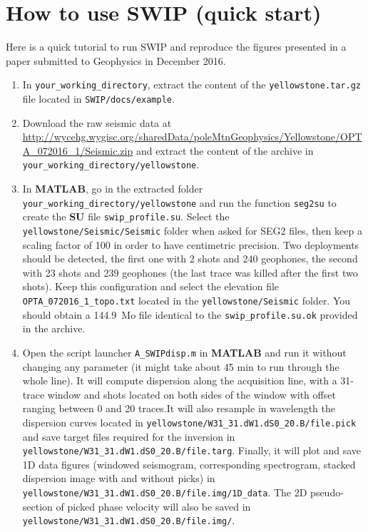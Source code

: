 \documentclass[twoside,a4paper]{article}
\def\SU{\textbf{SU}}
\def\MATLAB{\textbf{MATLAB}}
\begin{document}
\section{How to use SWIP (quick start)}
Here is a quick tutorial to run SWIP and reproduce the figures presented in a paper submitted to Geophysics in December 2016.
\begin{enumerate}[leftmargin=*]
\setlength\itemsep{2ex}
\item In \verb|your_working_directory|, extract the content of the \verb|yellowstone.tar.gz| file located in \verb|SWIP/docs/example|.

\item Download the raw seismic data at \url{http://wycehg.wygisc.org/sharedData/poleMtnGeophysics/Yellowstone/OPTA_072016_1/Seismic.zip} and extract the content of the archive in \verb|your_working_directory/yellowstone|.

\item In {\MATLAB}, go in the extracted folder \verb|your_working_directory/yellowstone| and run the function \verb|seg2su| to create the {\SU} file \verb|swip_profile.su|. Select the \verb|yellowstone/Seismic/Seismic| folder when asked for SEG2 files, then keep a scaling factor of 100 in order to have centimetric precision. Two deployments should be detected, the first one with 2 shots and 240 geophones, the second with 23 shots and 239 geophones (the last trace was killed after the first two shots). Keep this configuration and select the elevation file \verb|OPTA_072016_1_topo.txt| located in the \verb|yellowstone/Seismic| folder. You should obtain a 144.9~Mo file identical to the \verb|swip_profile.su.ok| provided in the archive.

\item Open the script launcher \verb|A_SWIPdisp.m| in {\MATLAB} and run it without changing any parameter (it might take about 45 min to run through the whole line). It will compute dispersion along the acquisition line, with a 31-trace window and shots located on both sides of the window with offset ranging between 0 and 20 traces.It will also resample in wavelength the dispersion curves located in \verb|yellowstone/W31_31.dW1.dS0_20.B/file.pick| and save target files required for the inversion in \verb|yellowstone/W31_31.dW1.dS0_20.B/file.targ|. Finally, it will plot and save 1D data figures (windowed seismogram, corresponding spectrogram, stacked dispersion image with and without picks) in \verb|yellowstone/W31_31.dW1.dS0_20.B/file.img/1D_data|. The 2D pseudo-section of picked phase velocity will also be saved in \verb|yellowstone/W31_31.dW1.dS0_20.B/file.img/|.


\end{enumerate}
\end{document}
